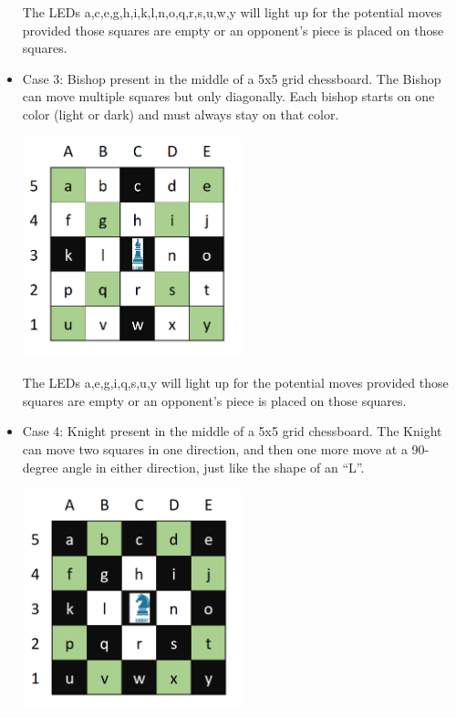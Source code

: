 \documentclass[12pt, titlepage]{article}
\begin{document}
\begin{itemize}
  The LEDs a,c,e,g,h,i,k,l,n,o,q,r,s,u,w,y will light up for the potential moves provided those squares are empty or an opponent’s piece is placed on those squares.

    \item Case 3: Bishop present in the middle of a 5x5 grid chessboard. The Bishop can move multiple squares but only diagonally. Each bishop starts on one color (light or dark) 
    and must always stay on that color. 

    \begin{minipage}{\linewidth}
      \centering
      \includegraphics[width=0.5\textwidth]{bishop}
  \end{minipage}

  The LEDs a,e,g,i,q,s,u,y will light up for the potential moves provided those squares are empty or an opponent’s piece is placed on those squares.

    \item Case 4: Knight present in the middle of a 5x5 grid chessboard. The Knight can move two squares in one direction, and then one more move at a 90-degree angle in either 
    direction, just like the shape of an “L”. 

    \begin{minipage}{\linewidth}
      \centering
      \includegraphics[width=0.5\textwidth]{knight}
  \end{minipage}


\end{itemize}
\end{document}
